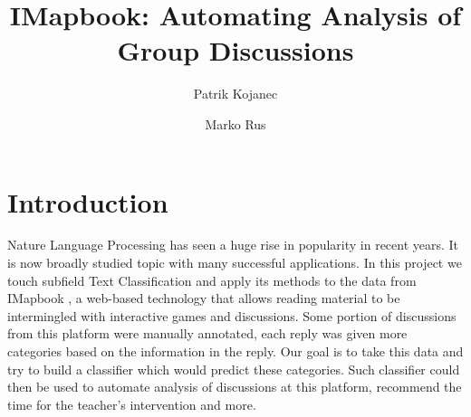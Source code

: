 \documentclass[11pt,a4paper]{article}
\title{IMapbook: Automating Analysis of Group Discussions}
\author{Patrik Kojanec \and Marko Rus}
\date{}
\begin{document}
\maketitle


\section{Introduction}
Nature Language Processing has seen a huge rise in popularity in recent years. It is now broadly studied topic with many successful applications. In this project we touch subfield Text Classification and apply its methods to the data from IMapbook \cite{imapbook}, a web-based technology that allows reading material to be intermingled with interactive games and discussions. Some portion of discussions from this platform were manually annotated, each reply was given more categories based on the information in the reply. Our goal is to  take this data and try to build a classifier which would predict these categories. Such classifier could then be used to automate analysis of discussions at this platform, recommend the time for the teacher’s intervention and more.
\end{document}
